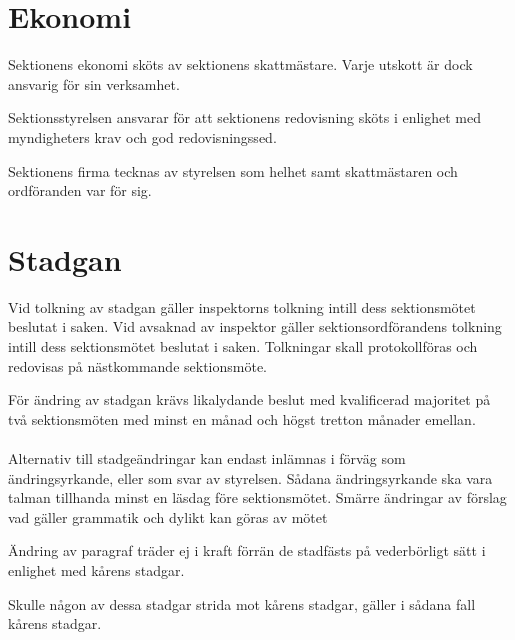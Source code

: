 \documentclass[stadgar]{dsekprotokoll}
\begin{document}
\section{Ekonomi}

\begin{stadgeavsnitt}


Sektionens ekonomi sköts av sektionens skattmästare. Varje utskott är dock
ansvarig för sin verksamhet.


Sektionsstyrelsen ansvarar för att sektionens redovisning sköts i enlighet
med myndigheters krav och god redovisningssed.


Sektionens firma tecknas av styrelsen som helhet samt skattmästaren och ordföranden
var för sig.

\end{stadgeavsnitt}

\section{Stadgan}

\begin{stadgeavsnitt}


Vid tolkning av stadgan gäller inspektorns tolkning intill dess
sektionsmötet beslutat i saken. Vid avsaknad av inspektor gäller
sektionsordförandens tolkning intill dess sektionsmötet beslutat i saken.
Tolkningar skall protokollföras och redovisas på nästkommande
sektionsmöte.


För ändring av stadgan krävs likalydande beslut med kvalificerad majoritet
på två sektionsmöten med minst en månad och högst tretton månader emellan.
\\\\
Alternativ till stadgeändringar kan endast inlämnas i förväg som ändringsyrkande, eller som svar av styrelsen. Sådana ändringsyrkande ska vara talman tillhanda minst en läsdag före sektionsmötet. Smärre ändringar av förslag vad gäller grammatik och dylikt kan göras av mötet


Ändring av paragraf träder ej i kraft förrän de stadfästs på vederbörligt
sätt i enlighet med kårens stadgar.


Skulle någon av dessa stadgar strida mot kårens stadgar, gäller i sådana
fall kårens stadgar.

\end{stadgeavsnitt}
\end{document}
